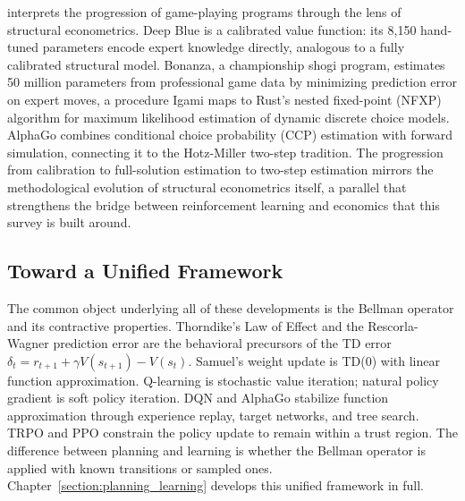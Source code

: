 \citet{Igami2020} interprets the progression of game-playing programs through the lens of structural econometrics. Deep Blue is a calibrated value function: its 8,150 hand-tuned parameters encode expert knowledge directly, analogous to a fully calibrated structural model. Bonanza, a championship shogi program, estimates 50 million parameters from professional game data by minimizing prediction error on expert moves, a procedure Igami maps to Rust's nested fixed-point (NFXP) algorithm for maximum likelihood estimation of dynamic discrete choice models. AlphaGo combines conditional choice probability (CCP) estimation with forward simulation, connecting it to the Hotz-Miller two-step tradition. The progression from calibration to full-solution estimation to two-step estimation mirrors the methodological evolution of structural econometrics itself, a parallel that strengthens the bridge between reinforcement learning and economics that this survey is built around.

\subsection{Toward a Unified Framework}

The common object underlying all of these developments is the Bellman operator and its contractive properties. Thorndike's Law of Effect and the Rescorla-Wagner prediction error are the behavioral precursors of the TD error $\delta_t = r_{t+1} + \gamma V(s_{t+1}) - V(s_t)$. Samuel's weight update is TD(0) with linear function approximation. Q-learning is stochastic value iteration; natural policy gradient is soft policy iteration. DQN and AlphaGo stabilize function approximation through experience replay, target networks, and tree search. TRPO and PPO constrain the policy update to remain within a trust region. The difference between planning and learning is whether the Bellman operator is applied with known transitions or sampled ones. Chapter~\ref{section:planning_learning} develops this unified framework in full.
